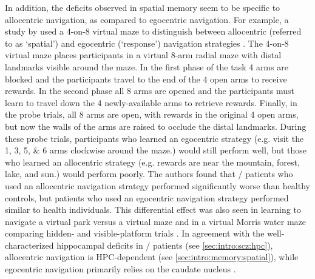 In addition, the deficits observed in spatial memory seem to be specific to allocentric navigation, as compared to egocentric navigation.
For example, a study by \citeauthor{Wilkins2013} used a 4-on-8 virtual maze to distinguish between allocentric (referred to as `spatial') and egocentric (`response') navigation strategies \citep{Wilkins2013}.
The 4-on-8 virtual maze places participants in a virtual 8-arm radial maze with distal landmarks visible around the maze.
In the first phase of the task 4 arms are blocked and the participants travel to the end of the 4 open arms to receive rewards.
In the second phase all 8 arms are opened and the participants must learn to travel down the 4 newly-available arms to retrieve rewards.
Finally, in the probe trials, all 8 arms are open, with rewards in the original 4 open arms, but now the walls of the arms are raised to occlude the distal landmarks.
During these probe trials, participants who learned an egocentric strategy (e.g. visit the 1, 3, 5, \& 6 arms clockwise around the maze.) would still perform well, but those who learned an allocentric strategy (e.g. rewards are near the mountain, forest, lake, and sun.) would perform poorly.
The authors found that \scz/ patients who used an allocentric navigation strategy performed significantly worse than healthy controls, but patients who used an egocentric navigation strategy performed similar to health individuals.
This differential effect was also seen in learning to navigate a virtual park versus a virtual maze \citep{Weniger2008} and in a virtual Morris water maze comparing hidden- and visible-platform trials \citep{Hanlon2006}.
In agreement with the well-characterized hippocampal deficits in \scz/ patients (see \autoref{sec:intro:scz:hpc}), allocentric navigation is \acs{HPC}-dependent (see \autoref{sec:intro:memory:spatial}), while egocentric navigation primarily relies on the caudate nucleus \citep{Hartley2003}.

